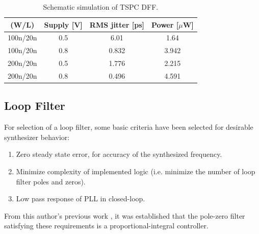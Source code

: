 		\begin{table}[h!]
			\centering
			\def\arraystretch{1.5}		
			\setlength\arrayrulewidth{0.75pt}
			\setlength{\tabcolsep}{1em} %
			\begin{tabular}{|c|c|c|c|}
				\hline 
				\rule[-1ex]{0pt}{2.5ex} \cellcolor{gray!40}\textbf{(W/L)} & \cellcolor{gray!40}\textbf{Supply [V]} & \cellcolor{gray!40}\textbf{RMS jitter [ps]}& \cellcolor{gray!40}\textbf{Power [$\mu$W]}\\ 
				\hline 
				\rule[-1ex]{0pt}{2.5ex} 100n/20n  & 0.5 & 6.01 & 1.64\\ 
				\hline 
				\rule[-1ex]{0pt}{2.5ex} 100n/20n  & 0.8 & 0.832  & 3.942\\ 
				\hline 
				\rule[-1ex]{0pt}{2.5ex} 200n/20n  & 0.5 & 1.776 & 2.215 \\ 
				\hline 
				\rule[-1ex]{0pt}{2.5ex} 200n/20n  & 0.8 & 0.496  & 4.591 \\ 
				\hline 
			\end{tabular} 
			\caption{Schematic simulation of TSPC DFF.}
			\label{tab:dff}
		\end{table}   










	\FloatBarrier
	\subsection{Loop Filter}
	For selection of a loop filter, some basic criteria have been selected for desirable synthesizer behavior:
	\begin{enumerate}[itemsep=0pt,label=\protect\mycirc{\arabic*}]
		\setlength\itemsep{-0.8em}
		\item Zero steady state error, for accuracy of the synthesized frequency.
		\item Minimize complexity of implemented logic (i.e. minimize the number of loop filter poles and zeros).
		\item Low pass response of PLL in closed-loop.
	\end{enumerate}
	From this author's previous work \cite{Me}, it was established that the pole-zero filter satisfying these requirements is a proportional-integral controller.

